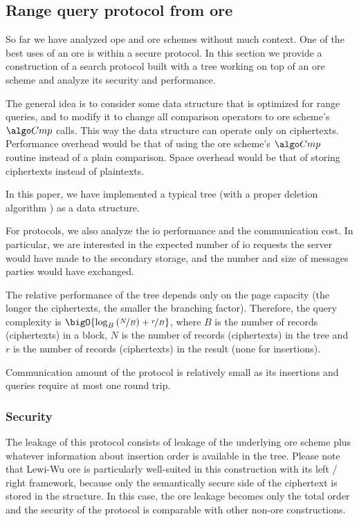 \subsection{Range query protocol from \acrshort{ore}}\label{section:range-snapshot:ore-to-protocol}

	So far we have analyzed \acrshort{ope} and \acrshort{ore} schemes without much context.
	One of the best uses of an \acrshort{ore} is within a secure protocol.
	In this section we provide a construction of a search protocol built with a {\BPlus} tree working on top of an \acrshort{ore} scheme and analyze its security and performance.

	The general idea is to consider some data structure that is optimized for range queries, and to modify it to change all comparison operators to \acrshort{ore} scheme's $\compare$ calls.
	This way the data structure can operate only on ciphertexts.
	Performance overhead would be that of using the \acrshort{ore} scheme's $\compare$ routine instead of a plain comparison.
	Space overhead would be that of storing ciphertexts instead of plaintexts.

	In this paper, we have implemented a typical {\BPlus} tree \cite{b-tree} (with a proper deletion algorithm \cite{b-plus-tree-deletion}) as a data structure.

	For protocols, we also analyze the \acrshort{io} performance and the communication cost.
	In particular, we are interested in the expected number of \acrshort{io} requests the server would have made to the secondary storage, and the number and size of messages parties would have exchanged.

	The relative performance of the {\BPlus} tree depends only on the page capacity (the longer the ciphertexts, the smaller the branching factor). 	Therefore, the query complexity is $\bigO{\log_B \left( \nicefrac{N}{B} \right) + \nicefrac{r}{B}}$, where $B$ is the number of records (ciphertexts) in a block, $N$ is the number of records (ciphertexts) in the tree and $r$ is the number of records (ciphertexts) in the result (none for insertions).

	Communication amount of the protocol is relatively small as its insertions and queries require at most one round trip.

	\subsubsection{Security}
		The leakage of this protocol consists of leakage of the underlying \acrshort{ore} scheme plus whatever information about insertion order is available in the {\BPlus} tree.
		Please note that Lewi-Wu \cite{lewi-wu-ore} \acrshort{ore} is particularly well-suited in this construction with its left / right framework, because only the semantically secure side of the ciphertext is stored in the structure.
		In this case, the \acrshort{ore} leakage becomes only the total order and the security of the protocol is comparable with other non-\acrshort{ore} constructions.
